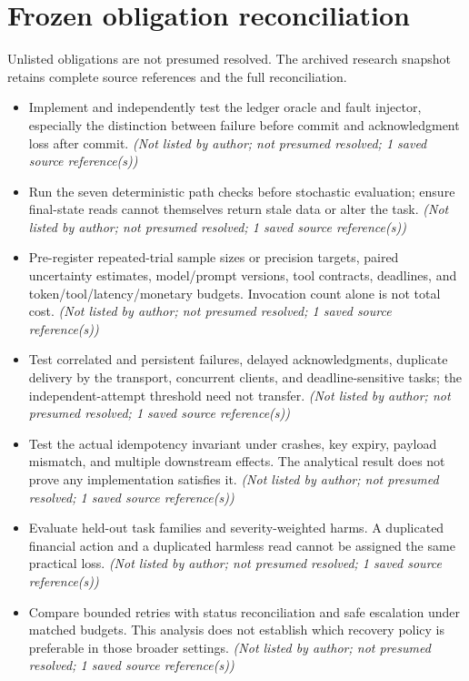 \documentclass[11pt]{article}
\begin{document}
\section{Frozen obligation reconciliation}
Unlisted obligations are not presumed resolved. The archived research snapshot retains complete source references and the full reconciliation.
\begin{itemize}
\item Implement and independently test the ledger oracle and fault injector, especially the distinction between failure before commit and acknowledgment loss after commit. \textit{ (Not listed by author; not presumed resolved; 1 saved source reference(s))}
\item Run the seven deterministic path checks before stochastic evaluation; ensure final-state reads cannot themselves return stale data or alter the task. \textit{ (Not listed by author; not presumed resolved; 1 saved source reference(s))}
\item Pre-register repeated-trial sample sizes or precision targets, paired uncertainty estimates, model/prompt versions, tool contracts, deadlines, and token/tool/latency/monetary budgets. Invocation count alone is not total cost. \textit{ (Not listed by author; not presumed resolved; 1 saved source reference(s))}
\item Test correlated and persistent failures, delayed acknowledgments, duplicate delivery by the transport, concurrent clients, and deadline-sensitive tasks; the independent-attempt threshold need not transfer. \textit{ (Not listed by author; not presumed resolved; 1 saved source reference(s))}
\item Test the actual idempotency invariant under crashes, key expiry, payload mismatch, and multiple downstream effects. The analytical result does not prove any implementation satisfies it. \textit{ (Not listed by author; not presumed resolved; 1 saved source reference(s))}
\item Evaluate held-out task families and severity-weighted harms. A duplicated financial action and a duplicated harmless read cannot be assigned the same practical loss. \textit{ (Not listed by author; not presumed resolved; 1 saved source reference(s))}
\item Compare bounded retries with status reconciliation and safe escalation under matched budgets. This analysis does not establish which recovery policy is preferable in those broader settings. \textit{ (Not listed by author; not presumed resolved; 1 saved source reference(s))}

\end{itemize}
\end{document}
